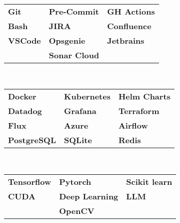 \documentclass[grey]{hipstercv}
\begin{document}
\begin{paracol}{2}
{\begin{adjustwidth}{1cm}{0cm}
\begin{minipage}[t]{0.3\textwidth}
\bigskip
{} \\


\begin{tabular}{>{\centering\arraybackslash}p{6.0em}>{\centering\arraybackslash}p{6.0em}>{\centering\arraybackslash}p{6.0em}}
    \textbf{Git} & \textbf{Pre-Commit} & \textbf{GH Actions}\\
    \textbf{Bash} & \textbf{JIRA} & \textbf{Confluence}\\
    \textbf{VSCode} & \textbf{Opsgenie} & \textbf{Jetbrains}\\
    & \textbf{Sonar Cloud} &
\end{tabular}



\bigskip
{} \\

\begin{tabular}{>{\centering\arraybackslash}p{6.0em}>{\centering\arraybackslash}p{6.0em}>{\centering\arraybackslash}p{6.0em}}
    \textbf{Docker} & \textbf{Kubernetes} & \textbf{Helm Charts}\\
    \textbf{Datadog} & \textbf{Grafana} & \textbf{Terraform} \\
    \textbf{Flux} & \textbf{Azure} & \textbf{Airflow} \\ 
    \textbf{PostgreSQL} & \textbf{SQLite} & \textbf{Redis} \\ 
\end{tabular}

\bigskip
{} \\

\begin{tabular}{>{\centering\arraybackslash}p{6.0em}>{\centering\arraybackslash}p{6.0em}>{\centering\arraybackslash}p{6.0em}}
    \textbf{Tensorflow} & \textbf{Pytorch} & \textbf{Scikit learn}\\
    \textbf{CUDA} & \textbf{Deep Learning} & \textbf{LLM} \\
    & \textbf{OpenCV} & \\
\end{tabular}

\bigskip


\end{minipage}


\bigskip



\end{adjustwidth}}
\end{paracol}
\end{document}
